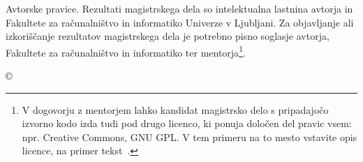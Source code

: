 \thispagestyle{empty}
\vspace*{\fill}
{\noindent\footnotesize
{\sc Avtorske pravice}. Rezultati magistrskega dela so intelektualna lastnina avtorja in Fakultete za ra\-ču\-nal\-niš\-tvo in informatiko Univerze v Ljubljani. Za objavljanje ali izkoriščanje rezultatov ma\-gi\-str\-ske\-ga dela je potrebno pisno soglasje avtorja, Fakultete za ra\-ču\-nal\-niš\-tvo in informatiko ter mentorja\footnote{V dogovorju z mentorjem lahko kandidat magistrsko delo s pripadajočo izvorno kodo izda tudi pod drugo licenco, ki ponuja določen del pravic vsem: npr. Creative Commons, GNU GPL. V tem primeru na to mesto vstavite opis licence, na primer tekst~\cite{licence}.}.}
\begin{center}
{\footnotesize{\sc \copyright \myyear\ \myname}}
\end{center}